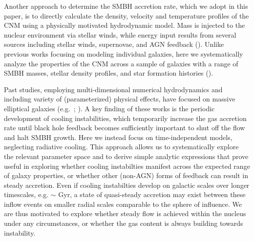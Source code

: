 \documentclass[usenatbib,fleqn]{mn2e}
\begin{document}

Another approach to determine the SMBH accretion rate, which we adopt
in this paper, is to directly calculate the density, velocity and
temperature profiles of the CNM using a physically motivated
hydrodynamic model.  Mass is injected to the nuclear environment via
stellar winds, while energy input results from several sources
including stellar winds, supernovae, and AGN feedback
(\citealt{Quataert:2004a,De-ColleGuillochon+:2012a,ShcherbakovWong+:2014a}).
Unlike previous works focusing on modeling individual galaxies, here
we systematically analyze the properties of the CNM across a sample of
galaxies with a range of SMBH masses, stellar density profiles, and
star formation histories (\citealt{WangMerritt:2004a}).

Past studies, employing multi-dimensional numerical hydrodynamics and
including variety of (parameterized) physical effects, have focused on
massive elliptical galaxies (e.g.~\citealt{Ciotti&Ostriker07};
\citealt{Ciotti+10}).  A key finding of these works is the periodic
development of cooling instabilities, which temporarily increase the
gas accretion rate until black hole feedback becomes sufficiently
important to shut off the flow and halt SMBH growth.  Here we instead
focus on time-independent models, neglecting radiative cooling.  This
approach allows us to systematically explore the relevant parameter
space and to derive simple analytic expressions that prove useful in
exploring whether cooling instabilties manifest across the expected
range of galaxy properties, or whether other (non-AGN) forms of
feedback can result in steady accretion.  Even if cooling instabilties
develop on galactic scales over longer timescales, e.g. $\sim$ Gyr, a
state of quasi-steady accretion may exist between these inflow events
on smaller radial scales comparable to the sphere of influence.  We
are thus motivated to explore whether steady flow is achieved within
the nucleus under any circumstances, or whether the gas content is
always building towards instability.
\end{document}

